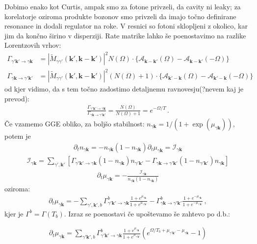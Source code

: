 \documentclass[a4paper,10pt]{article}
\renewcommand{\vec}[1]{\mathbf{#1}}
\begin{document}
Dobimo enako kot Curtis, ampak smo za fotone privzeli, da cavity ni leaky; za korelatorje oziroma produkte bozonov smo privzeli da imajo točno definirane resonance in dodali regulator na roke. V resnici so fotoni sklopljeni z okolico, kar jim da končno širino v disperziji. Rate matrike lahko še poenostavimo na razlike Lorentzovih vrhov: 
\begin{align}
  \Gamma_{\gamma' \vec{k}' \to \gamma \vec{k}} &= | \widetilde{M}_{\gamma \gamma'}(\vec{k}', \vec{k} -\vec{k}') |^2 N(\Omega) \cdot \Big\{\mathcal{A}_{\vec{k}-\vec{k}'}(\Omega) - \mathcal{A}_{\vec{k}-\vec{k}'}(-\Omega) \Big\} \\ \Gamma_{\gamma \vec{k} \to \gamma' \vec{k}'} &= | \widetilde{M}_{\gamma \gamma'}(\vec{k}', \vec{k} - \vec{k}') |^2 (N(\Omega) + 1) \cdot \Big\{ \mathcal{A}_{\vec{k}'-\vec{k}}(\Omega) - \mathcal{A}_{\vec{k}'-\vec{k}}(-\Omega) \Big\} 
\end{align} 
od kjer vidimo, da s tem točno zadostimo detaljnemu ravnovesju(?nevem kaj je prevod): 
\begin{align}
  \frac{\Gamma_{\gamma' \vec{k}' \to \gamma \vec{k}}}{\Gamma_{\gamma \vec{k} \to \gamma' \vec{k}'}} = \frac{N(\Omega) }{N(\Omega)  +1} = e^{-\Omega /  T}\,.
\end{align}
Če vzamemo GGE obliko, za boljšo stabilnost: $n_{\gamma \vec{k}} = 1/(1+\exp(\mu_{\gamma \vec k}))$, potem je 
\begin{align}
  \partial_t n_{\gamma \vec{k}} = -n_{\gamma \vec{k}} (1 - n_{\gamma \vec{k}}) \partial_t \mu_{\gamma \vec{k}} = \mathcal{I}_{\gamma \vec{k}}
\end{align}
\begin{align}
  \mathcal{I}_{\gamma \vec{k}} = \sum_{\gamma', \vec{k}'} \left[ \Gamma_{\gamma' \vec{k}' \to \gamma \vec{k}} (1 - n_{\gamma \vec{k}}) n_{\gamma' \vec{k}'} -  \Gamma_{\gamma \vec{k} \to \gamma' \vec{k}'} (1 - n_{\gamma' \vec{k}'}) n_{\gamma \vec{k}} \right]
\end{align}
\begin{align}
  \partial_t \mu_{\gamma \vec{k}} = -\frac{\mathcal{I}_{\gamma \vec{k}}}{n_{\gamma \vec{k}} (1 - n_{\gamma \vec{k}})}
\end{align}
oziroma: 
\begin{align}
  \partial_t \mu_{\gamma \vec{k}} = -\sum_{\gamma', \vec{k}', b} \Gamma_{\gamma' \vec{k}' \to \gamma \vec{k}}^{b} \frac{1 + e^{\mu_{\gamma \vec{k}}}}{1 + e^{\mu_{\gamma' \vec{k}'}}} - \Gamma_{\gamma \vec{k} \to \gamma' \vec{k}'}^{b} \frac{1 + e^{-\mu_{\gamma \vec{k}}}}{1 + e^{-\mu_{\gamma' \vec{k}'}}}\,,
\end{align}
kjer je $\Gamma^{b}=\Gamma(T_b)$. Izraz se poenostavi če upoštevamo še zahtevo po d.b.: 
\begin{tcolorbox}
  \begin{align}
    \partial_t \mu_{\gamma \vec{k}} = \sum_{\gamma' \vec{k}', b} \Gamma_{\gamma' \vec{k}' \to \gamma \vec{k}}^b \frac{1 + e^{\mu_{\gamma \vec{k}}}}{1 + e^{\mu_{\gamma' \vec{k}'}}} \left(e^{\Omega / T_b + \mu_{\gamma' \vec{k}'} - \mu_{\gamma \vec{k}}} - 1\right)
  \end{align}
\end{tcolorbox}
\end{document}
